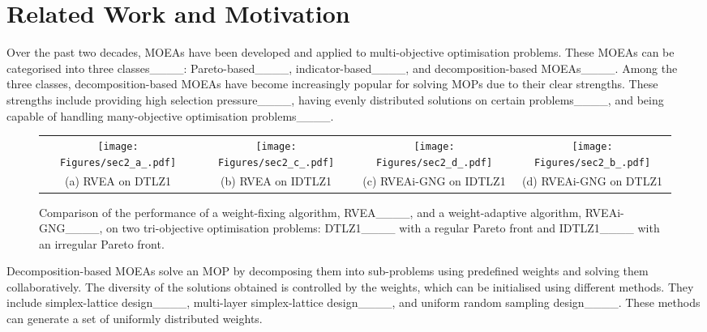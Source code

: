 \section{Related Work and Motivation}
Over the past two decades, MOEAs have been developed and applied to multi-objective optimisation problems. 
These MOEAs can be categorised into three classes____: Pareto-based____, indicator-based____, and decomposition-based MOEAs____. Among the three classes, decomposition-based MOEAs have become increasingly popular for solving MOPs due to their clear strengths. These strengths include providing high selection pressure____, having evenly distributed solutions on certain problems____, and being capable of handling many-objective optimisation problems____. 
\begin{figure*}[tbp]
	\begin{center}
        \begin{tabular}{@{}c@{}c@{}c@{}c@{}}			
			\texttt{[image: Figures/sec2\_a\_.pdf]}&
			\texttt{[image: Figures/sec2\_c\_.pdf]}&
			\texttt{[image: Figures/sec2\_d\_.pdf]}&
			\texttt{[image: Figures/sec2\_b\_.pdf]}\\
			(a) RVEA on DTLZ1 & (b) RVEA on IDTLZ1 & (c) RVEAi-GNG on IDTLZ1 & (d) RVEAi-GNG on DTLZ1 \\
		\end{tabular}
	\end{center}
	\caption{Comparison of the performance of a weight-fixing algorithm, RVEA____, and a weight-adaptive algorithm, RVEAi-GNG____, on two tri-objective optimisation problems: DTLZ1____ with a regular Pareto front and IDTLZ1____ with an irregular Pareto front.}
	\label{fig:sec2}
\end{figure*}

Decomposition-based MOEAs solve an MOP by decomposing them into sub-problems using predefined weights and solving them collaboratively. The diversity of the solutions obtained is controlled by the weights, which can be initialised using different methods. They include simplex-lattice design____, multi-layer simplex-lattice design____, and uniform random sampling design____. These methods can generate a set of uniformly distributed weights.

